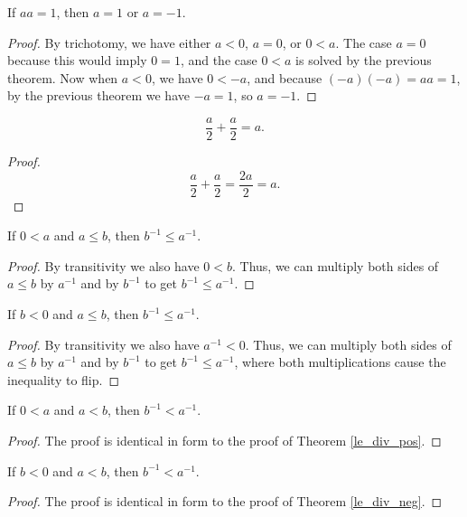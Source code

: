 \documentclass[../../math.tex]{subfiles}
\begin{document}
\begin{theorem}
    If $aa = 1$, then $a = 1$ or $a = -1$.
\end{theorem}
\begin{proof}
    By trichotomy, we have either $a < 0$, $a = 0$, or $0 < a$.  The case $a =
    0$ because this would imply $0 = 1$, and the case $0 < a$ is solved by the
    previous theorem.  Now when $a < 0$, we have $0 < -a$, and because $(-a)(-a)
    = aa = 1$, by the previous theorem we have $-a = 1$, so $a = -1$.
\end{proof}

\begin{theorem}
    \[
        \frac{a}{2} + \frac{a}{2} = a.
    \]
\end{theorem}
\begin{proof}
    \[
        \frac{a}{2} + \frac{a}{2} = \frac{2a}{2} = a.
    \]
\end{proof}

\begin{theorem} \label{le_div_pos}
    If $0 < a$ and $a \leq b$, then $b^{-1} \leq a^{-1}$.
\end{theorem}
\begin{proof}
    By transitivity we also have $0 < b$.  Thus, we can multiply both sides
    of $a \leq b$ by $a^{-1}$ and by $b^{-1}$ to get $b^{-1} \leq a^{-1}$.
\end{proof}

\begin{theorem} \label{le_div_neg}
    If $b < 0$ and $a \leq b$, then $b^{-1} \leq a^{-1}$.
\end{theorem}
\begin{proof}
    By transitivity we also have $a^{-1} < 0$.  Thus, we can multiply both sides
    of $a \leq b$ by $a^{-1}$ and by $b^{-1}$ to get $b^{-1} \leq a^{-1}$, where
    both multiplications cause the inequality to flip.
\end{proof}

\begin{theorem}
    If $0 < a$ and $a < b$, then $b^{-1} < a^{-1}$.
\end{theorem}
\begin{proof}
    The proof is identical in form to the proof of Theorem \ref{le_div_pos}.
\end{proof}

\begin{theorem}
    If $b < 0$ and $a < b$, then $b^{-1} < a^{-1}$.
\end{theorem}
\begin{proof}
    The proof is identical in form to the proof of Theorem \ref{le_div_neg}.
\end{proof}
\end{document}
